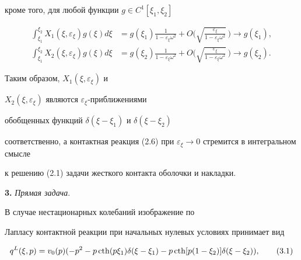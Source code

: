 кроме того, для любой функции $g\in C^{1}[\xi_{1},\xi_{2}]$


\begin{align*}


\int_{\xi_{1}}^{\xi_{2}} X_{1}(\xi,\varepsilon_{\xi}) g(\xi) d\xi&=


g(\xi_{1})\frac{1}{1-\varepsilon_{\xi}\omega^{2}}+


O\bigg(\sqrt{\frac{\varepsilon_{\xi}}{1-\varepsilon_{\xi}\omega^{2}}}\,\bigg)


\to g(\xi_{1}),\\


\int_{\xi_{1}}^{\xi_{2}} X_{2}(\xi,\varepsilon_{\xi}) g(\xi) d\xi&=


g(\xi_{2})\frac{1}{1-\varepsilon_{\xi}\omega^{2}}+


O\bigg(\sqrt{\frac{\varepsilon_{\xi}}{1-\varepsilon_{\xi}\omega^{2}}}\,\bigg)


\to g(\xi_{2}).


\end{align*}








Таким образом, $X_{1}(\xi,\varepsilon_{\xi})$ и


$X_{2}(\xi,\varepsilon_{\xi})$ являются $\varepsilon_{\xi}$-приближениями


обобщенных функций $\delta(\xi-\xi_{1})$ и $\delta(\xi-\xi_{2})$


соответственно, а контактная реакция (2.6) при $\varepsilon_{\xi}


\to 0$ стремится в интегральном смысле


к решению (2.1) задачи жесткого контакта оболочки и накладки.


\medskip





{\bf 3.} {\it Прямая задача}.


В случае нестационарных колебаний изображение по


Лапласу контактной реакции при начальных нулевых условиях принимает вид


\begin{equation}


q^{L}(\xi,p)=v_{0}(p)(


-p^{2}-p \cth(p\xi_{1})\delta(\xi-\xi_{1})-


p \cth[p(1-\xi_{2})]\delta(\xi-\xi_{2})),


\tag{3.1}


\end{equation}


